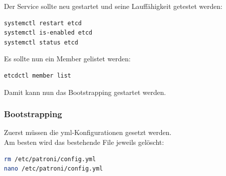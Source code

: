 Der Service sollte neu gestartet und seine Lauffähigkeit getestet werden:
\lstset{style=gra_codestyle}
\begin{lstlisting}[language=bash, caption=etcd - restart,captionpos=b,label={lst:etcd_restart},breaklines=true]
systemctl restart etcd
systemctl is-enabled etcd
systemctl status etcd
\end{lstlisting}

Es sollte nun ein Member gelistet werden:
\lstset{style=gra_codestyle}
\begin{lstlisting}[language=bash, caption=etcd - member list,captionpos=b,label={lst:etcd_member_list},breaklines=true]
etcdctl member list
\end{lstlisting}

Damit kann nun das Bootstrapping gestartet werden.

\subsubsection{Bootstrapping}
Zuerst müssen die yml-Konfigurationen gesetzt werden.\\
Am besten wird das bestehende File jeweils gelöscht:
\lstset{style=gra_codestyle}
\begin{lstlisting}[language=bash, caption=Patroni Bootstrap - Konfiguration bereinigen,captionpos=b,label={lst:patroni-bootstrap-cleanup-yml},breaklines=true]
rm /etc/patroni/config.yml
nano /etc/patroni/config.yml
\end{lstlisting}

